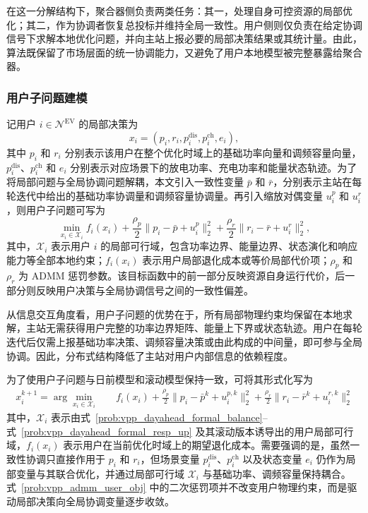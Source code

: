 在这一分解结构下，聚合器侧负责两类任务：其一，处理自身可控资源的局部优化；其二，作为协调者恢复总投标并维持全局一致性。用户侧则仅负责在给定协调信号下求解本地优化问题，并向主站上报必要的局部决策结果或其统计量。由此，算法既保留了市场层面的统一协调能力，又避免了用户本地模型被完整暴露给聚合器。

\subsubsection{用户子问题建模}
\label{subsubsec:vpp_admm_model_algorithm_user}

记用户 $i \in \mathcal{N}^{\mathrm{EV}}$ 的局部决策为
\begin{equation}
x_i = \left(p_i, r_i, p_i^{\mathrm{dis}}, p_i^{\mathrm{ch}}, e_i\right),
\end{equation}
其中 $p_i$ 和 $r_i$ 分别表示该用户在整个优化时域上的基础功率向量和调频容量向量，$p_i^{\mathrm{dis}}$、$p_i^{\mathrm{ch}}$ 和 $e_i$ 分别表示对应场景下的放电功率、充电功率和能量状态轨迹。为了将局部问题与全局协调问题解耦，本文引入一致性变量 $\bar p$ 和 $\bar r$，分别表示主站在每轮迭代中给出的基础功率协调量和调频容量协调量。再引入缩放对偶变量 $u_i^p$ 和 $u_i^r$，则用户子问题可写为
\begin{equation}
\min_{x_i \in \mathcal{X}_i}
f_i(x_i)
+ \frac{\rho_p}{2} \|p_i - \bar p + u_i^p\|_2^2
+ \frac{\rho_r}{2} \|r_i - \bar r + u_i^r\|_2^2,
\end{equation}
其中，$\mathcal{X}_i$ 表示用户 $i$ 的局部可行域，包含功率边界、能量边界、状态演化和响应能力等全部本地约束；$f_i(x_i)$ 表示用户局部退化成本或等价局部代价项；$\rho_p$ 和 $\rho_r$ 为 ADMM 惩罚参数。该目标函数中的前一部分反映资源自身运行代价，后一部分则反映用户决策与全局协调信号之间的一致性偏差。

从信息交互角度看，用户子问题的优势在于，所有局部物理约束均保留在本地求解，主站无需获得用户完整的功率边界矩阵、能量上下界或状态轨迹。用户在每轮迭代后仅需上报基础功率决策、调频容量决策或由此构成的中间量，即可参与全局协调。因此，分布式结构降低了主站对用户内部信息的依赖程度。

为了使用户子问题与日前模型和滚动模型保持一致，可将其形式化写为
\begin{subequations}
\label{prob:vpp_admm_user}
\begin{align}
x_i^{k+1} = \arg\min_{x_i \in \mathcal{X}_i}
\quad & f_i(x_i)
+ \frac{\rho_p}{2} \|p_i - \bar p^k + u_i^{p,k}\|_2^2
+ \frac{\rho_r}{2} \|r_i - \bar r^k + u_i^{r,k}\|_2^2 \label{prob:vpp_admm_user_obj}
\end{align}
\end{subequations}
其中，$\mathcal{X}_i$ 表示由式~\eqref{prob:vpp_dayahead_formal_balance}--式~\eqref{prob:vpp_dayahead_formal_resp_up} 及其滚动版本诱导出的用户局部可行域，$f_i(x_i)$ 表示用户在当前优化时域上的期望退化成本。需要强调的是，虽然一致性协调只直接作用于 $p_i$ 和 $r_i$，但场景变量 $p_i^{\mathrm{dis}}$、$p_i^{\mathrm{ch}}$ 以及状态变量 $e_i$ 仍作为局部变量与其联合优化，并通过局部可行域 $\mathcal{X}_i$ 与基础功率、调频容量保持耦合。式~\eqref{prob:vpp_admm_user_obj} 中的二次惩罚项并不改变用户物理约束，而是驱动局部决策向全局协调变量逐步收敛。

